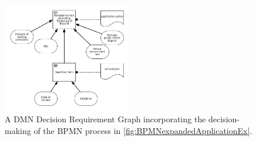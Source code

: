 \begin{figure}
\begin{center}
\includegraphics[width=0.5\textwidth]{../figures/chapter_indicators/DMN_Application_Example_Deadline_ToR.png} 
\end{center}
\caption{A DMN Decision Requirement Graph incorporating the decision-making of the BPMN process in \ref{fig:BPMNexpandedApplicationEx}.}
\label{fig:DMN_DRD_Application}
\end{figure}


